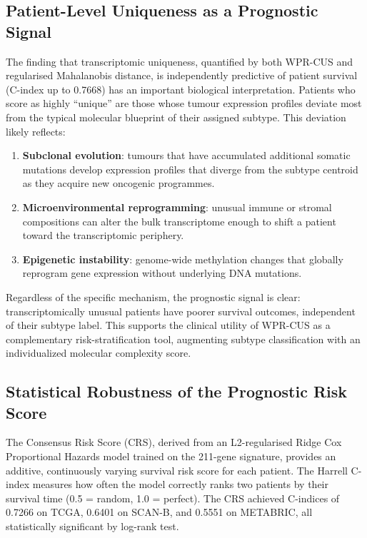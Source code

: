 \documentclass[10pt,a4paper,twocolumn]{article}
\begin{document}
\subsection{Patient-Level Uniqueness as a Prognostic Signal}

The finding that transcriptomic uniqueness, quantified by both WPR-CUS and regularised Mahalanobis distance, is independently predictive of patient survival (C-index up to 0.7668) has an important biological interpretation. Patients who score as highly ``unique'' are those whose tumour expression profiles deviate most from the typical molecular blueprint of their assigned subtype. This deviation likely reflects:

\begin{enumerate}
    \item \textbf{Subclonal evolution}: tumours that have accumulated additional somatic mutations develop expression profiles that diverge from the subtype centroid as they acquire new oncogenic programmes.
    \item \textbf{Microenvironmental reprogramming}: unusual immune or stromal compositions can alter the bulk transcriptome enough to shift a patient toward the transcriptomic periphery.
    \item \textbf{Epigenetic instability}: genome-wide methylation changes that globally reprogram gene expression without underlying DNA mutations.
\end{enumerate}

Regardless of the specific mechanism, the prognostic signal is clear: transcriptomically unusual patients have poorer survival outcomes, independent of their subtype label. This supports the clinical utility of WPR-CUS as a complementary risk-stratification tool, augmenting subtype classification with an individualized molecular complexity score.

\subsection{Statistical Robustness of the Prognostic Risk Score}

The Consensus Risk Score (CRS), derived from an L2-regularised Ridge Cox Proportional Hazards model trained on the 211-gene signature, provides an additive, continuously varying survival risk score for each patient. The Harrell C-index measures how often the model correctly ranks two patients by their survival time (0.5 = random, 1.0 = perfect). The CRS achieved C-indices of 0.7266 on TCGA, 0.6401 on SCAN-B, and 0.5551 on METABRIC, all statistically significant by log-rank test.
\end{document}
